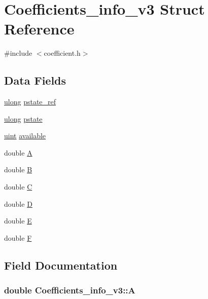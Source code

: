 \hypertarget{structCoefficients__info__v3}{}\section{Coefficients\+\_\+info\+\_\+v3 Struct Reference}
\label{structCoefficients__info__v3}


{\ttfamily \#include $<$coefficient.\+h$>$}

\subsection*{Data Fields}
\begin{DoxyCompactItemize}
\item 
\hyperlink{generic_8h_a718b4eb2652c286f4d42dc18a8e71a1a}{ulong} \hyperlink{structCoefficients__info__v3_a194ea05d7255ee1e16400df7764c7a48}{pstate\+\_\+ref}
\item 
\hyperlink{generic_8h_a718b4eb2652c286f4d42dc18a8e71a1a}{ulong} \hyperlink{structCoefficients__info__v3_a4aa51829fee753e73adf63784ed53f94}{pstate}
\item 
\hyperlink{generic_8h_a91ad9478d81a7aaf2593e8d9c3d06a14}{uint} \hyperlink{structCoefficients__info__v3_a791f0a4135cbc4405307f628c440dea9}{available}
\item 
double \hyperlink{structCoefficients__info__v3_afacc199d92b6a64b4ec1dba3c54ed017}{A}
\item 
double \hyperlink{structCoefficients__info__v3_a31423b481fbf4994975905b2fd614676}{B}
\item 
double \hyperlink{structCoefficients__info__v3_a450de4414fba1a630a9e2622ad472fca}{C}
\item 
double \hyperlink{structCoefficients__info__v3_a3bd37db94aa33fbb28b17bca380fe237}{D}
\item 
double \hyperlink{structCoefficients__info__v3_a25d975fcdc705cab2dfc980868d9894f}{E}
\item 
double \hyperlink{structCoefficients__info__v3_a1af4d0fbc6523a1172115b330ed60edd}{F}
\end{DoxyCompactItemize}


\subsection{Field Documentation}
\subsubsection[{\texorpdfstring{A}{A}}]{\setlength{\rightskip}{0pt plus 5cm}double Coefficients\+\_\+info\+\_\+v3\+::A}\hypertarget{structCoefficients__info__v3_afacc199d92b6a64b4ec1dba3c54ed017}{}\label{structCoefficients__info__v3_afacc199d92b6a64b4ec1dba3c54ed017}
